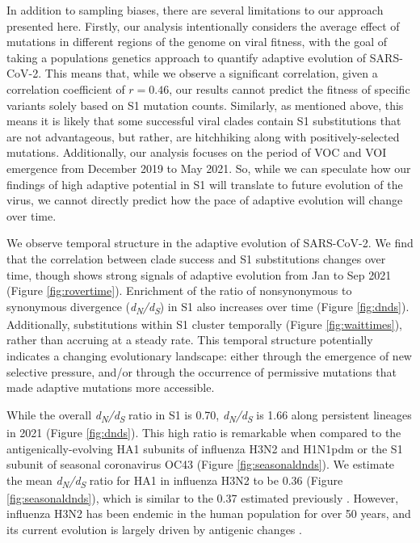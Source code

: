 \documentclass[11pt,oneside,letterpaper]{article}
\newcommand{\dnds}{\emph{d\textsubscript{N}/d\textsubscript{S}}}
\begin{document}
In addition to sampling biases, there are several limitations to our approach presented here.
Firstly, our analysis intentionally considers the average effect of mutations in different regions of the genome on viral fitness, with the goal of taking a populations genetics approach to quantify adaptive evolution of SARS-CoV-2.
This means that, while we observe a significant correlation, given a correlation coefficient of $r = 0.46$, our results cannot predict the fitness of specific variants solely based on S1 mutation counts.
Similarly, as mentioned above, this means it is likely that some successful viral clades contain S1 substitutions that are not advantageous, but rather, are hitchhiking along with positively-selected mutations.
Additionally, our analysis focuses on the period of VOC and VOI emergence from December 2019 to May 2021.
So, while we can speculate how our findings of high adaptive potential in S1 will translate to future evolution of the virus, we cannot directly predict how the pace of adaptive evolution will change over time.

We observe temporal structure in the adaptive evolution of SARS-CoV-2.
We find that the correlation between clade success and S1 substitutions changes over time, though shows strong signals of adaptive evolution from Jan to Sep 2021 (Figure \ref{fig:rovertime}).
Enrichment of the ratio of nonsynonymous to synonymous divergence (\dnds{}) in S1 also increases over time (Figure \ref{fig:dnds}).
Additionally, substitutions within S1 cluster temporally (Figure \ref{fig:waittimes}), rather than accruing at a steady rate.
This temporal structure potentially indicates a changing evolutionary landscape: either through the emergence of new selective pressure, and/or through the occurrence of permissive mutations that made adaptive mutations more accessible.

While the overall \dnds{} ratio in S1 is 0.70, \dnds{} is 1.66 along persistent lineages in 2021 (Figure \ref{fig:dnds}).
This high ratio is remarkable when compared to the antigenically-evolving HA1 subunits of influenza H3N2 and H1N1pdm or the S1 subunit of seasonal coronavirus OC43 (Figure \ref{fig:seasonaldnds}).
We estimate the mean \dnds{} ratio for HA1 in influenza H3N2 to be 0.36 (Figure \ref{fig:seasonaldnds}), which is similar to the 0.37 estimated previously \cite{Wolf2006-vy}.
However, influenza H3N2 has been endemic in the human population for over 50 years, and its current evolution is largely driven by antigenic changes \cite{Smith2004-if}.
\end{document}
